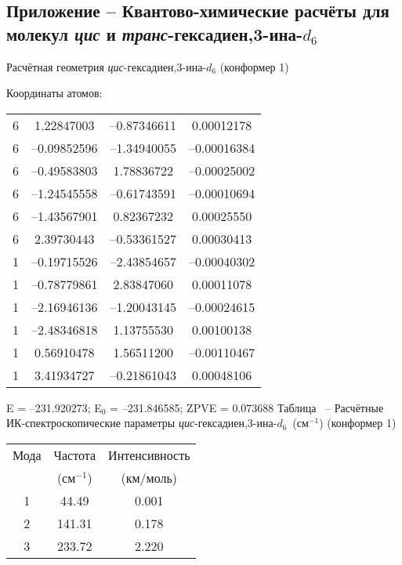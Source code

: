 {\subsection*{Приложение   -- Квантово-химические расчёты для молекул {\itshape цис} и {\itshape транс}-гексадиен,3\nobreakdash-ина-$d_6$}
Расчётная геометрия {\itshape цис}-гексадиен,3\nobreakdash-ина-$d_6$ (конформер 1)

Координаты атомов:
\begin{center}
\begin{tabular}{cccc}
   6  &   1.22847003 & --0.87346611 &  0.00012178\\
   6  &  --0.09852596 & --1.34940055 & --0.00016384\\
   6  &  --0.49583803 &  1.78836722 & --0.00025002\\
   6  &  --1.24545558 & --0.61743591 & --0.00010694\\
   6  &  --1.43567901 &  0.82367232 &  0.00025550\\
   6  &   2.39730443 & --0.53361527 &  0.00030413\\
   1  &  --0.19715526 & --2.43854657 & --0.00040302\\
   1  &  --0.78779861 &  2.83847060 &  0.00011078\\
   1  &  --2.16946136 & --1.20043145 & --0.00024615\\
   1  &  --2.48346818 &  1.13755530 &  0.00100138\\
   1  &   0.56910478 &  1.56511200 & --0.00110467\\
   1  &   3.41934727 & --0.21861043 &  0.00048106\\
 \end{tabular}
\end{center}
E =  --231.920273;    E$_0$ =  --231.846585; ZPVE = 0.073688
\newpage {}
Таблица \thet\, -- Расчётные ИК-спектроскопические параметры {\itshape цис}-гексадиен,3\nobreakdash-ина-$d_6$~(см$^{-1}$) (конформер 1)
 \begin{center}
\begin{tabular}{ccc}
Мода & Частота   & Интенсивность \\
&(см$^{-1}$)&(км/моль)\\
 \hline
     1 &   44.49 &    0.001 \\
     2 &  141.31 &     0.178 \\
     3 &  233.72 &     2.220 \\

\end{tabular}
\end{center}}
